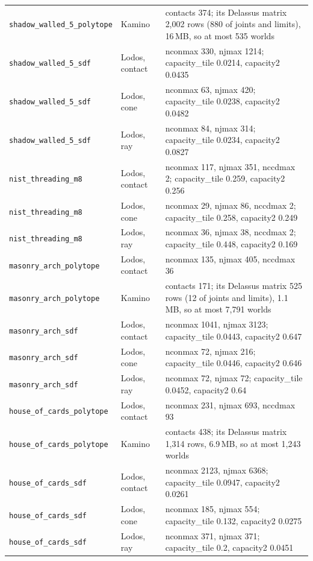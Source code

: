 \begin{longtable}{@{}llp{9.5cm}@{}}
\texttt{shadow\_walled\_5\_polytope} & Kamino & contacts 374; its Delassus matrix 2,002 rows (880 of joints and limits), 16\,MB, so at most 535 worlds \\
\texttt{shadow\_walled\_5\_sdf} & Lodos, contact & nconmax 330, njmax 1214; capacity\_tile 0.0214, capacity2 0.0435 \\
\texttt{shadow\_walled\_5\_sdf} & Lodos, cone & nconmax 63, njmax 420; capacity\_tile 0.0238, capacity2 0.0482 \\
\texttt{shadow\_walled\_5\_sdf} & Lodos, ray & nconmax 84, njmax 314; capacity\_tile 0.0234, capacity2 0.0827 \\
\texttt{nist\_threading\_m8} & Lodos, contact & nconmax 117, njmax 351, nccdmax 2; capacity\_tile 0.259, capacity2 0.256 \\
\texttt{nist\_threading\_m8} & Lodos, cone & nconmax 29, njmax 86, nccdmax 2; capacity\_tile 0.258, capacity2 0.249 \\
\texttt{nist\_threading\_m8} & Lodos, ray & nconmax 36, njmax 38, nccdmax 2; capacity\_tile 0.448, capacity2 0.169 \\
\texttt{masonry\_arch\_polytope} & Lodos, contact & nconmax 135, njmax 405, nccdmax 36 \\
\texttt{masonry\_arch\_polytope} & Kamino & contacts 171; its Delassus matrix 525 rows (12 of joints and limits), 1.1\,MB, so at most 7,791 worlds \\
\texttt{masonry\_arch\_sdf} & Lodos, contact & nconmax 1041, njmax 3123; capacity\_tile 0.0443, capacity2 0.647 \\
\texttt{masonry\_arch\_sdf} & Lodos, cone & nconmax 72, njmax 216; capacity\_tile 0.0446, capacity2 0.646 \\
\texttt{masonry\_arch\_sdf} & Lodos, ray & nconmax 72, njmax 72; capacity\_tile 0.0452, capacity2 0.64 \\
\texttt{house\_of\_cards\_polytope} & Lodos, contact & nconmax 231, njmax 693, nccdmax 93 \\
\texttt{house\_of\_cards\_polytope} & Kamino & contacts 438; its Delassus matrix 1,314 rows, 6.9\,MB, so at most 1,243 worlds \\
\texttt{house\_of\_cards\_sdf} & Lodos, contact & nconmax 2123, njmax 6368; capacity\_tile 0.0947, capacity2 0.0261 \\
\texttt{house\_of\_cards\_sdf} & Lodos, cone & nconmax 185, njmax 554; capacity\_tile 0.132, capacity2 0.0275 \\
\texttt{house\_of\_cards\_sdf} & Lodos, ray & nconmax 371, njmax 371; capacity\_tile 0.2, capacity2 0.0451 \\

\end{longtable}
